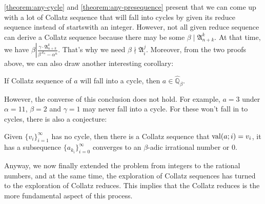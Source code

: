 \cref{theorem:any-cycle} and \cref{theorem:any-presequence} present that we can come up with a lot of Collatz sequence that will fall into cycles by given its reduce sequence instead of startswith an integer.
However, not all given reduce sequence can derive a Collatz sequence because there may be some $\beta\mid \mathfrak{A}_{n+k}^{k}$.
At that time, we have $\beta \left\vert \frac{\gamma\cdot\mathfrak{A}_{n+k}^{k}}{\beta^{\mathcal{A}_n} - \alpha^n} \right.$.
That's why we need $\beta \nmid \mathfrak{A}_i^j$.
Moreover, from the two proofs above, we can also draw another interesting corollary:
\begin{theorem}
    If Collatz sequence of $a$ will fall into a cycle, then $a \in \widehat{\mathbb{Q}}_{{\beta}}$.
\end{theorem}
However, the converse of this conclusion does not hold.
For example, $a=3$ under $\alpha = 11$, $\beta=2$ and $\gamma=1$ may never fall into a cycle.
For these won't fall in to cycles, there is also a conjecture:
\begin{conjecture}
    Given $\{v_{i}\}_{i=1}^{\infty}$ has no cycle, then there is a Collatz sequence that $\operatorname{val}(a;i) = v_{i}$, it has a subsequence $\{a_{k_i}\}_{i=0}^{\infty}$ converges to an $\beta$-adic irrational number or $0$.
\end{conjecture}

Anyway, we now finally extended the problem from integers to the rational numbers, and at the same time, the exploration of Collatz sequences has turned to the exploration of Collatz reduces.
This implies that the Collatz reduces is the more fundamental aspect of this process.


